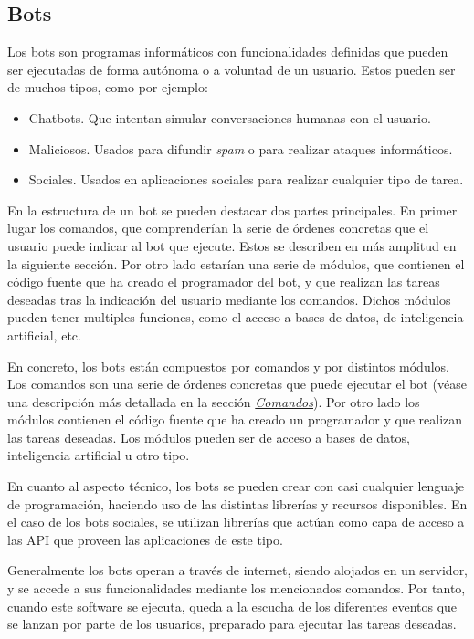 \subsection{Bots}

Los bots son programas informáticos con funcionalidades definidas que pueden ser ejecutadas de forma autónoma o a voluntad de un usuario. Estos pueden ser de muchos tipos, como por ejemplo:

\begin{itemize}
	\item Chatbots. Que intentan simular conversaciones humanas con el usuario.
	\item Maliciosos. Usados para difundir \textit{spam} o para realizar ataques informáticos.
	\item Sociales. Usados en aplicaciones sociales para realizar cualquier tipo de tarea.
\end{itemize}

En la estructura de un bot se pueden destacar dos partes principales. En primer lugar los comandos, que comprenderían la serie de órdenes concretas que el usuario puede indicar al bot que ejecute. Estos se describen en más amplitud en la siguiente sección. Por otro lado estarían una serie de módulos, que contienen el código fuente que ha creado el programador del bot, y que realizan las tareas deseadas tras la indicación del usuario mediante los comandos. Dichos módulos pueden tener multiples funciones, como el acceso a bases de datos, de inteligencia artificial, etc.

En concreto, los bots están compuestos por comandos y por distintos módulos. Los comandos son una serie de órdenes concretas que puede ejecutar el bot (véase una descripción más detallada en la sección \hyperref[sec:comandos]{\textit{Comandos}}). Por otro lado los módulos contienen el código fuente que ha creado un programador y que realizan las tareas deseadas. Los módulos pueden ser de acceso a bases de datos, inteligencia artificial u otro tipo.

En cuanto al aspecto técnico, los bots se pueden crear con casi cualquier lenguaje de programación, haciendo uso de las distintas librerías y recursos disponibles. En el caso de los bots sociales, se utilizan librerías que actúan como capa de acceso a las API que proveen las aplicaciones de este tipo.

Generalmente los bots operan a través de internet, siendo alojados en un servidor, y se accede a sus funcionalidades mediante los mencionados comandos. Por tanto, cuando este software se ejecuta, queda a la escucha de los diferentes eventos que se lanzan por parte de los usuarios, preparado para ejecutar las tareas deseadas.

